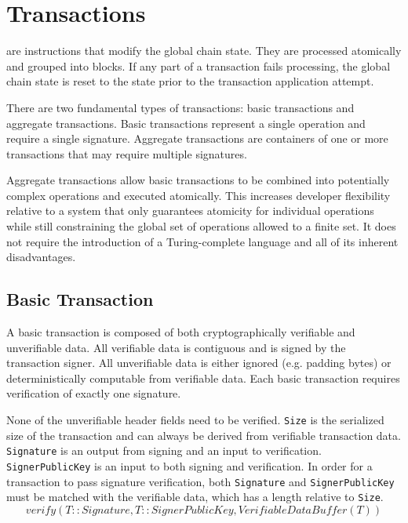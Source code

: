 \section{Transactions}
\label{sec:transactions}

\nemquote{
}{}

 are instructions that modify the global chain state.
They are processed atomically and grouped into blocks.
If any part of a transaction fails processing, the global chain state is reset to the state prior to the transaction application attempt.

There are two fundamental types of transactions: basic transactions and aggregate transactions.
Basic transactions represent a single operation and require a single signature.
Aggregate transactions are containers of one or more transactions that may require multiple signatures.

Aggregate transactions allow basic transactions to be combined into potentially complex operations and executed atomically.
This increases developer flexibility relative to a system that only guarantees atomicity for individual operations while still constraining the global set of operations allowed to a finite set.
It does not require the introduction of a Turing-complete language and all of its inherent disadvantages.

\subsection{Basic Transaction}

A basic transaction is composed of both cryptographically verifiable and unverifiable data.
All verifiable data is contiguous and is signed by the transaction signer.
All unverifiable data is either ignored (e.g. padding bytes) or deterministically computable from verifiable data.
Each basic transaction requires verification of exactly one signature.

None of the unverifiable header fields need to be verified.
\texttt{Size} is the serialized size of the transaction and can always be derived from verifiable transaction data.
\texttt{Signature} is an output from signing and an input to verification.
\texttt{SignerPublicKey} is an input to both signing and verification.
In order for a transaction to pass signature verification, both \texttt{Signature} and \texttt{SignerPublicKey} must be matched with the verifiable data, which has a length relative to \texttt{Size}.
$$verify(T::Signature, T::SignerPublicKey, VerifiableDataBuffer(T))$$

